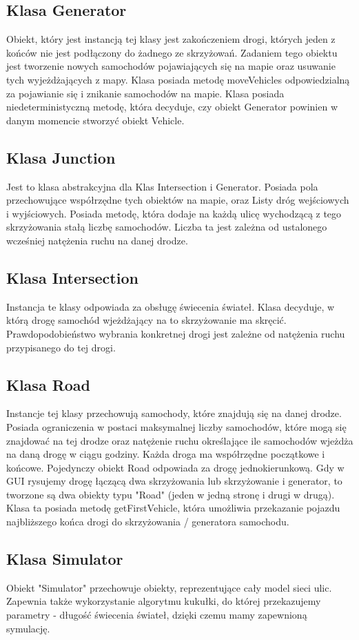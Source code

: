 \documentclass{article}
\begin{document}
\subsection{Klasa Generator}
    Obiekt, który jest instancją tej klasy jest zakończeniem drogi, których jeden z końców nie jest podłączony do żadnego ze skrzyżowań. Zadaniem tego obiektu jest tworzenie nowych samochodów pojawiających się na mapie oraz usuwanie tych wyjeżdżających z mapy. Klasa posiada metodę moveVehicles odpowiedzialną za pojawianie się i znikanie samochodów na mapie. Klasa posiada  niedeterministyczną metodę, która decyduje, czy obiekt Generator powinien w danym momencie stworzyć obiekt Vehicle.

\subsection{Klasa Junction}
    Jest to klasa abstrakcyjna dla Klas Intersection i Generator. Posiada pola przechowujące współrzędne tych obiektów na mapie, oraz Listy dróg wejściowych i wyjściowych. Posiada metodę, która dodaje na każdą ulicę wychodzącą z tego skrzyżowania stałą liczbę samochodów. Liczba ta jest zależna od ustalonego wcześniej natężenia ruchu na danej drodze.
\subsection{Klasa Intersection}
    Instancja te klasy odpowiada za obsługę świecenia świateł. Klasa decyduje, w którą drogę samochód wjeżdżający na to skrzyżowanie ma skręcić. Prawdopodobieństwo wybrania konkretnej drogi jest zależne od natężenia ruchu przypisanego do tej drogi.
\subsection{Klasa Road}
    Instancje tej klasy przechowują samochody, które znajdują się na danej drodze. Posiada ograniczenia w postaci maksymalnej liczby samochodów, które mogą się znajdować na tej drodze oraz natężenie ruchu określające ile samochodów wjeżdża na daną drogę w ciągu godziny. Każda droga ma współrzędne początkowe i końcowe. Pojedynczy obiekt Road odpowiada za drogę jednokierunkową. Gdy w GUI rysujemy drogę łączącą dwa skrzyżowania lub skrzyżowanie i generator, to tworzone są dwa obiekty typu "Road" (jeden w jedną stronę i drugi w drugą). Klasa ta posiada metodę getFirstVehicle, która umożliwia przekazanie pojazdu najbliższego końca drogi do skrzyżowania / generatora samochodu.
\subsection{Klasa Simulator}
    Obiekt "Simulator" przechowuje obiekty, reprezentujące cały model sieci ulic. Zapewnia także wykorzystanie algorytmu kukułki, do której przekazujemy parametry - długość świecenia świateł, dzięki czemu mamy zapewnioną symulację.
\end{document}
